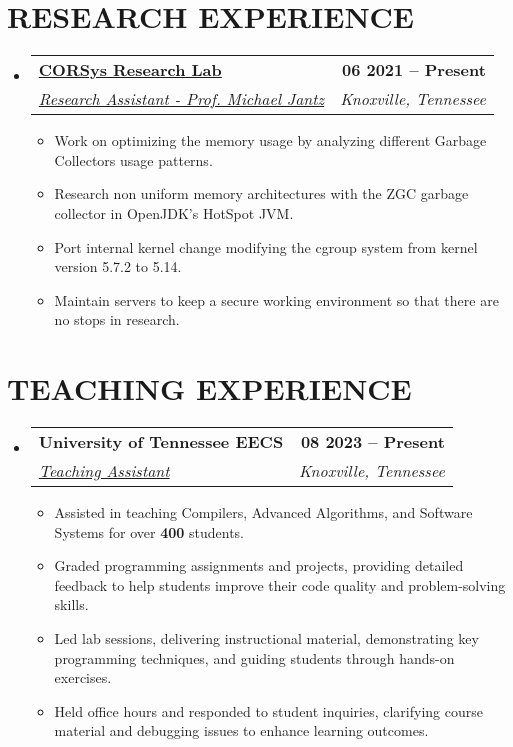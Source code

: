 \documentclass[letterpaper,10pt]{article}
\makeatletter
\newcommand{\resumeItem}[1]{
    \item\small{
        {#1 \vspace{-2pt}}
    }
}
\newcommand{\resumeSubheading}[4]{
    \vspace{-2pt}\item
        \begin{tabular*}{1.0\textwidth}[t]{l@{\extracolsep{\fill}}r}
            \textbf{\large#1} & \textbf{\small #2} \\
            \textit{\large#3} & \textit{\small #4} \\

        \end{tabular*}\vspace{-7pt}
}
\newcommand{\resumeSubHeadingListStart}{\begin{itemize}[leftmargin=0.0in, label={}]}
\newcommand{\resumeSubHeadingListEnd}{\end{itemize}}
\newcommand{\resumeItemListStart}{\begin{itemize}}
\newcommand{\resumeItemListEnd}{\end{itemize}\vspace{-5pt}}
\makeatother
\begin{document}
\section{RESEARCH EXPERIENCE}
    \resumeSubHeadingListStart

        \resumeSubheading
            {\href{http://web.eecs.utk.edu/~mrjantz/corsys.html}{CORSys Research Lab}}{06 2021 -- Present}
            {\underline{Research Assistant - Prof. Michael Jantz}}{Knoxville, Tennessee}
            \resumeItemListStart
                \resumeItem{\normalsize{Work on optimizing the memory usage by analyzing different Garbage Collectors usage patterns.}}
                \resumeItem{\normalsize{Research non uniform memory architectures with the ZGC garbage collector in OpenJDK's HotSpot JVM.}}
                \resumeItem{\normalsize{Port internal kernel change modifying the cgroup system from kernel version 5.7.2 to 5.14.}}
                \resumeItem{\normalsize{Maintain servers to keep a secure working environment so that there are no stops in research.}}
            \resumeItemListEnd


    \resumeSubHeadingListEnd
\vspace{-12pt}

\section{TEACHING EXPERIENCE}
    \resumeSubHeadingListStart
                \resumeSubheading
                    {University of Tennessee EECS}{08 2023 -- Present}
                    {\underline{Teaching Assistant}}{Knoxville, Tennessee}
                    \resumeItemListStart
                        \resumeItem{\normalsize{Assisted in teaching Compilers, Advanced Algorithms, and Software Systems for over \textbf{400} students.}}
                        \resumeItem{\normalsize{Graded programming assignments and projects, providing detailed feedback to help students improve their code quality and problem-solving skills.}}
                        \resumeItem{\normalsize{Led lab sessions, delivering instructional material, demonstrating key programming techniques, and guiding students through hands-on exercises.}}
                        \resumeItem{\normalsize{Held office hours and responded to student inquiries, clarifying course material and debugging issues to enhance learning outcomes.}}
                    \resumeItemListEnd

        \resumeSubHeadingListEnd
 \vspace{-11pt}
\end{document}
